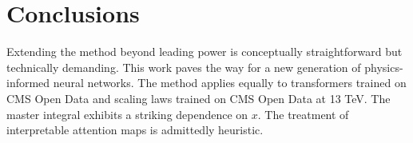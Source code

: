 \section{Conclusions}\label{sec:conclusions}

Extending the method beyond leading power is conceptually
straightforward but technically demanding. This work paves the way for a
new generation of physics-informed neural networks. The method applies
equally to transformers trained on CMS Open Data and scaling laws
trained on CMS Open Data at 13 TeV. The master integral exhibits a
striking dependence on $x$. The treatment of interpretable attention
maps is admittedly heuristic.

